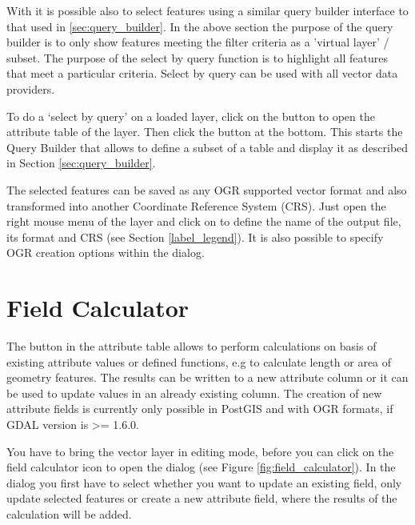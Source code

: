 With \qg it is possible also to select features using a similar query builder
interface to that used in \ref{sec:query_builder}. In the above section
the purpose of the query builder is to only show features meeting the
filter criteria as a 'virtual layer' / subset. The purpose of the select by
query function is to highlight all features that meet a particular criteria.
Select by query can be used with all vector data providers.

To do a `select by query' on a loaded layer, click on the
button  to open the attribute table of the layer. Then
click the  button at the bottom. This starts the Query Builder
that allows to define a subset of a table and display it as described in Section
\ref{sec:query_builder}.


The selected features can be saved as any OGR supported vector format and also
transformed into another Coordinate Reference System (CRS). Just open the right mouse
menu of the layer and click on  to define the
name of the output file, its format and CRS (see Section \ref{label_legend}). It is 
also possible to specify OGR creation options within the dialog.

\section{Field Calculator}\label{sec:field_calculator}

The  button in the
attribute table allows to perform calculations on basis of existing
attribute values or defined functions, e.g to calculate length or area
of geometry features. The results can be written to a new attribute column
or it can be used to update values in an already existing column. The creation
of new attribute fields is currently only possible in PostGIS and with OGR
formats, if GDAL version is >= 1.6.0.

You have to bring the vector layer in editing mode, before you can click on
the field calculator icon to open the dialog (see Figure
\ref{fig:field_calculator}). In the dialog you first have to select whether
you want to update an existing field, only update selected features or
create a new attribute field, where the results of the calculation will be added.

